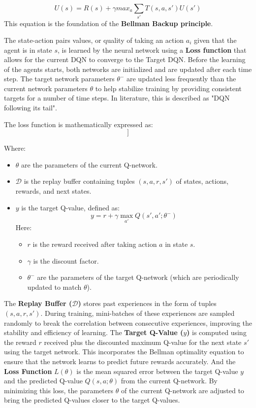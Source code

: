 \begin{equation}
    U(s) = R(s) + \gamma max _{a} \sum _{s'} T(s,a,s') U(s')
\end{equation}
This equation is the foundation of the \textbf{Bellman Backup principle}.

The state-action pairs values, or quality of taking an action $a_i$ given that the agent is in state $s$, is learned by the neural network using a \textbf{Loss function} that allows for the current DQN to converge to the Target DQN. Before the learning of the agents starts, both networks are initialized and are updated after each time step. The target network parameters $\theta^-$ are updated less frequently than the current network parameters $\theta$ to help stabilize training by providing consistent targets for a number of time steps. In literature, this is described as "DQN following its tail".


The loss function is mathematically expressed as:
\begin{equation}
    [
L(\theta) = \mathbb{E}_{(s, a, r, s') \sim \mathcal{D}} \left[ \left( y - Q(s, a; \theta) \right)^2 \right]
]
\end{equation}

Where:

\begin{itemize}
    \item $\theta$ are the parameters of the current Q-network.
    \item $\mathcal{D}$ is the replay buffer containing tuples $(s, a, r, s')$ of states, actions, rewards, and next states.
    \item $y$ is the target Q-value, defined as:
    \[
    y = r + \gamma \max_{a'} Q(s', a'; \theta^-)
    \]
    Here:
    \begin{itemize}
        \item $r$ is the reward received after taking action $a$ in state $s$.
        \item $\gamma$ is the discount factor.
        \item $\theta^-$ are the parameters of the target Q-network (which are periodically updated to match $\theta$).
    \end{itemize}
\end{itemize}

The \textbf{Replay Buffer ($\mathcal{D}$)} stores past experiences in the form of tuples $(s, a, r, s')$. During training, mini-batches of these experiences are sampled randomly to break the correlation between consecutive experiences, improving the stability and efficiency of learning. The \textbf{Target Q-Value ($y$)} is computed using the reward $r$ received plus the discounted maximum Q-value for the next state $s'$ using the target network. This incorporates the Bellman optimality equation to ensure that the network learns to predict future rewards accurately. And the \textbf{Loss Function} $L(\theta)$ is the mean squared error between the target Q-value $y$ and the predicted Q-value $Q(s, a; \theta)$ from the current Q-network. By minimizing this loss, the parameters $\theta$ of the current Q-network are adjusted to bring the predicted Q-values closer to the target Q-values.


